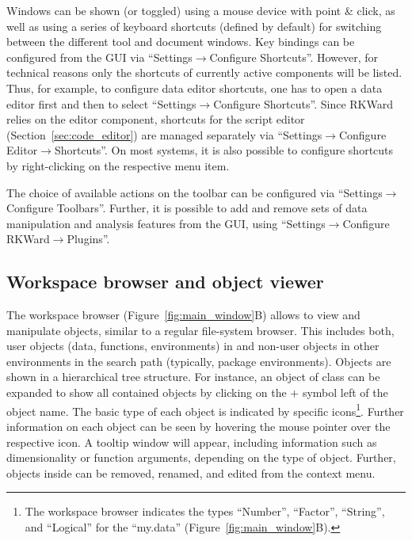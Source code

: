 Windows can be shown (or toggled) using a mouse device with point \&
click, as well as using a series of keyboard shortcuts (defined by
default) for switching between the different tool and document windows.
Key bindings can be configured from the GUI via ``Settings$\rightarrow$Configure Shortcuts''. 
However, for technical reasons only the shortcuts of currently active components 
will be listed. Thus, for example, to
configure data editor shortcuts, one has to open a data editor first and
then to select ``Settings$\rightarrow$Configure Shortcuts''. Since RKWard relies on the 
 editor component,
shortcuts for the script editor (Section~\ref{sec:code_editor}) are managed separately via 
``Settings$\rightarrow$Configure Editor$\rightarrow$Shortcuts''. On most systems, it is also
possible to configure shortcuts by right-clicking on the respective
menu item.

The choice of available actions on the toolbar can be
configured via ``Settings$\rightarrow$Configure Toolbars''. Further, it is possible to add and remove sets
of data manipulation and analysis features from the GUI, using
``Settings$\rightarrow$Configure RKWard$\rightarrow$Plugins''.

\subsection{Workspace browser and object viewer}
\label{sec:workspace_browser_object_viewer}

The workspace browser (Figure~\ref{fig:main_window}B) allows to view
and manipulate  objects, similar
to a regular file-system browser. This includes both, user objects
(data, functions, environments) in  and non-user objects in other environments in the
 search path (typically,
 package environments). Objects are shown
in a hierarchical tree structure. For instance, an object of class
 can be expanded to show all contained objects 
by clicking on the $+$ symbol left of the object name.
The basic type of each object is indicated by specific icons\footnote{The workspace browser 
indicates the types ``Number'', ``Factor'', ``String'', and ``Logical'' for the  
``my.data'' (Figure~\ref{fig:main_window}B).}. 
Further information on each object can be seen by hovering the mouse
pointer over the respective icon. A tooltip window will appear,
including information such as dimensionality or function arguments,
depending on the type of object. Further, objects inside  can be
removed, renamed, and edited from the context menu.

